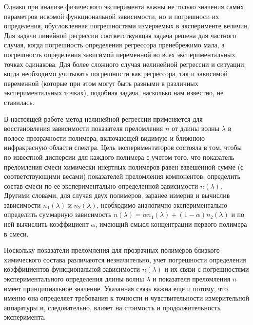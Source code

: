 \documentclass[12pt,a4paper]{article}
\theoremstyle{definition}
\begin{document}
Однако при анализе физического эксперимента важны не только значения самих параметров искомой функциональной зависимости, но и погрешноси их определения, обусловленная погрешностями измеряемых в эксперименте величин. Для задачи линейной регрессии соответствующая задача решена для частного случая, когда погрешность определения регрессора пренебрежимо мала, а погрешность определения зависимой переменной во всех экспериментальных точках одинакова\cite{Vatunin05}. Для более сложного случая нелинейной регрессии и ситуации, когда необходимо учитывать погрешности как регрессора, так и зависимой переменной (которые при этом могут быть разными в различных экспериментальных точках), подобная задача, насколько нам известно, не ставилась.

В настоящей работе метод нелинейной регрессии применяется для восстановления зависимости показателя преломления $n$ от длины волны $\lambda$ в полосе прозрачности полимера, включающей видимую и ближнюю инфракрасную области спектра. Цель экспериментаторов состояла в том, чтобы по известной дисперсии для каждого полимера с учетом того, что показатель преломления смеси химически инертных полимеров равен взвешенной сумме (с соответствующими весами) показателей преломления компонентов, определить состав смеси по ее экспериментально определенной зависимости $n(\lambda)$. Другими словами, для случая двух полимеров, заранее измерив и вычислив зависимости $n_1(\lambda)$ и $n_2(\lambda)$, необходимо аналогично экспериментально определить суммарную зависимость $n(\lambda) = \alpha n_1(\lambda) + (1 - \alpha) n_2(\lambda)$ и по ней вычислить коэффициент $\alpha$, имеющий смысл концентрации первого полимера в смеси.

Поскольку показатели преломления для прозрачных полимеров близкого химического состава различаются незначительно, учет погрешности определения коэффициентов функциональной зависимости $n(\lambda)$ и их связи с погрешностями экспериментального определения длины волны $\lambda$ и показателя преломления $n$ имеет принципиальное значение. Указанная связь важна еще и потому, что именно она определяет требования к точности и чувствительности измерительной аппаратуры и, следовательно, влияет на стоимость и продолжительность эксперимента.
\end{document}

